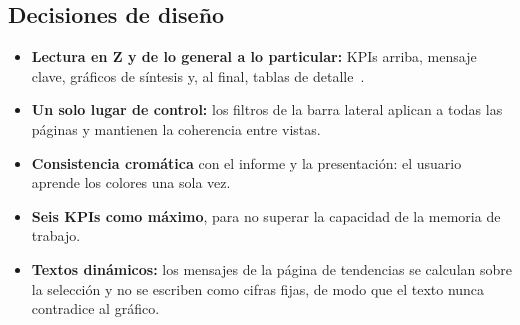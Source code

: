 \documentclass[conference,a4paper]{IEEEtran}
\begin{document}
\subsection{Decisiones de diseño}
\begin{itemize}
\item \textbf{Lectura en Z y de lo general a lo particular:} KPIs arriba, mensaje clave, gráficos de síntesis y, al final, tablas de detalle~\cite{few2006}.
\item \textbf{Un solo lugar de control:} los filtros de la barra lateral aplican a todas las páginas y mantienen la coherencia entre vistas.
\item \textbf{Consistencia cromática} con el informe y la presentación: el usuario aprende los colores una sola vez.
\item \textbf{Seis KPIs como máximo}, para no superar la capacidad de la memoria de trabajo.
\item \textbf{Textos dinámicos:} los mensajes de la página de tendencias se calculan sobre la selección y no se escriben como cifras fijas, de modo que el texto nunca contradice al gráfico.
\end{itemize}
\end{document}
